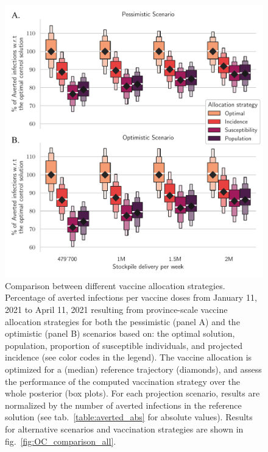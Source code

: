 \begin{figure}[!ht]
    \centering
    \includegraphics[width=\textwidth]{fig_italy-ocp/figures/scenarios_perturb_all.pdf}
    \caption[Comparison between different vaccine allocation strategies]{Comparison between different vaccine allocation strategies. Percentage of averted infections per vaccine doses from January 11, 2021 to April 11, 2021 resulting from province-scale vaccine allocation strategies for both the pessimistic (panel A) and the optimistic (panel B) scenarios based on: the optimal solution, population, proportion of susceptible individuals, and projected incidence (see color codes in the legend). The vaccine allocation is optimized for a (median) reference trajectory (diamonds), and assess the performance of the computed vaccination strategy over the whole posterior (box plots). For each projection scenario, results are normalized by the number of averted infections in the reference solution (see tab.~\ref{table:averted_abs} for absolute values). Results for alternative scenarios and vaccination strategies are shown in fig.~\ref{fig:OC_comparison_all}.}
    \label{fig:OC_comparison}
\end{figure}
